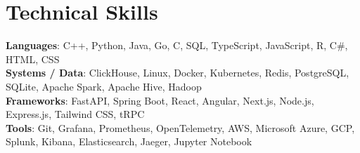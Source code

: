 \documentclass[letterpaper,11pt]{article}
\begin{document}
\section{Technical Skills}
 \begin{itemize}[leftmargin=0.15in, label={}]
    \small{\item{
     \textbf{Languages}{: C++, Python, Java, Go, C, SQL, TypeScript, JavaScript, R, C\#, HTML, CSS} \\
     \textbf{Systems / Data}{: ClickHouse, Linux, Docker, Kubernetes, Redis, PostgreSQL, SQLite, Apache Spark, Apache Hive, Hadoop} \\
     \textbf{Frameworks}{: FastAPI, Spring Boot, React, Angular, Next.js, Node.js, Express.js, Tailwind CSS, tRPC} \\
     \textbf{Tools}{: Git, Grafana, Prometheus, OpenTelemetry, AWS, Microsoft Azure, GCP, Splunk, Kibana, Elasticsearch, Jaeger, Jupyter Notebook} \\
    }}
 \end{itemize}
\end{document}
